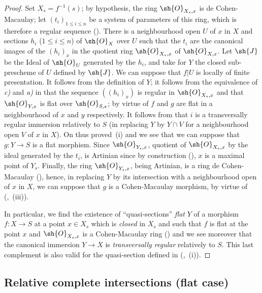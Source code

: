 \begin{proof}
Set $X_s=f^{-1}(s)$; by hypothesis, the ring $\sh{O}_{X_s,x}$ is de Cohen-Macaulay; let $(t_i)_{1\leq i\leq n}$ be a system of parameters of this ring, which is therefore a regular sequence ().
There is a neighbourhood open $U$ of $x$ in $X$ and sections $h_i$ ($1\leq i\leq n$) of $\sh{O}_X$ over $U$ such that the $t_i$ are the canonical images of the $(h_i)_x$ in the quotient ring $\sh{O}_{X_s,x}$ of $\sh{O}_{X,x}$.
Let $\sh{J}$ be the Ideal of $\sh{O}_U$ generated by the $h_i$, and take for $Y$ the closed sub-prescheme of $U$ defined by $\sh{J}$.
We can suppose that $f|U$ is locally of finite presentation.
It follows from the definition of $Y$; it follows from the equivalence of \emph{c)} and \emph{a)} in  that the sequence $((h_i)_x)$ is regular in $\sh{O}_{X_s,x}$ and that $\sh{O}_{Y,x}$ is flat over $\sh{O}_{S,s}$; by virtue of  $f$ and $g$ are flat in a neighbourhood of $x$ and $y$ respectively.
It follows from  that $i$ is a transversally regular immersion relatively to $S$ (in replacing $Y$ by $Y\cap V$ for a neighbourhood open $V$ of $x$ in $X$).
On thus proved~(i) and we see that we can suppose that $g:Y\to S$ is a flat morphism.
Since $\sh{O}_{Y_s,x}$, quotient of $\sh{O}_{X_s,x}$ by the ideal generated by the $t_i$, is Artinian since by construction (), $x$ is a maximal point of $Y_s$.
Finally, the ring $\sh{O}_{Y_s,x}$, being Artinian, is a ring de Cohen-Macaulay (), hence, in replacing $Y$ by its intersection with a neighbourhood open of $x$ in $X$, we can suppose that $g$ is a Cohen-Macaulay morphism, by virtue of (,~(iii)).

In particular, we find the existence of ``quasi-sections'' \emph{flat} $Y$ of a morphism $f:X\to S$ at a point $x\in X_s$ which is \emph{closed} in $X_s$ and such that $f$ is flat at the point $x$ and $\sh{O}_{X_s,x}$ is a Cohen-Macaulay ring () and we see moreover that the canonical immersion $Y\to X$ is \emph{transversally regular} relatively to $S$.
This last complement is also valid for the quasi-section defined in (,~(i)).
\end{proof}

\subsection{Relative complete intersections (flat case)}
\label{subsection:IV.19.3}

